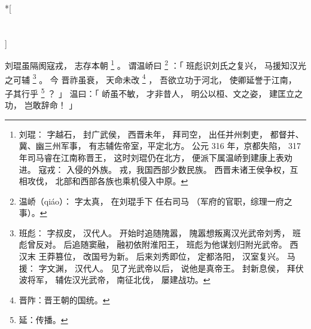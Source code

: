 
\switchcolumn[0]*[\section{}]

刘琨虽隔阂寇戎，
志存本朝%
\footnote{%
    刘琨：
        字越石，
        封广武侯，
        西晋未年，
        拜司空，
        出任并州刺吏，
        都督并、冀、幽三州军事，
        有志辅佐帝室，平定北方。
        公元 316 年，京都失陷，
        317 年司马睿在江南称晋王，
        这时刘琨仍在北方，
        便派下属温峤到建康上表劝进。
    寇戎：
        入侵的外族。
        戎，我国西部少数民族。
        西晋未诸王侯争权，互相攻伐，
        北部和西部各族也乘机侵入中原。
}%
。
谓温峤曰%
\footnote{%
    温峤（qiáo）：
        字太真，
        在刘琨手下
        任右司马
        （军府的官职，综理一府之事）。
}%
：「
    班彪识刘氏之复兴，
    马援知汉光之可辅%
    \footnote{%
        班彪：
            字叔皮，
            汉代人。
            开始时追随隗嚣，
            隗嚣想叛离汉光武帝刘秀，
            班彪曾反对。
            后追随窦融，
            融初依附淮阳王，
            班彪为他谋划归附光武帝。
            西汉末
            王莽篡位，
            改国号为新。
            后来刘秀即位，
            定都洛阳，
            汉室复兴。
        马援：
            字文渊，
            汉代人。
            见了光武帝以后，
            说他是真帝王。
            封新息侯，
            拜伏波将军，
            辅佐汉光武帝，
            南征北伐，
            屡建战功。
    }%
    。
    今
    晋祚虽衰，
    天命未改%
    \footnote{%
        晋阼：晋王朝的国统。
    }%
    ，
    吾欲立功于河北，
    使卿延誉于江南，
    子其行乎%
    \footnote{%
        延：传播。
    }%
    ？
」
温曰：「
    峤虽不敏，
    才非昔人，
    明公以桓、文之姿，
    建匡立之功，
    岂敢辞命！
」

\switchcolumn




